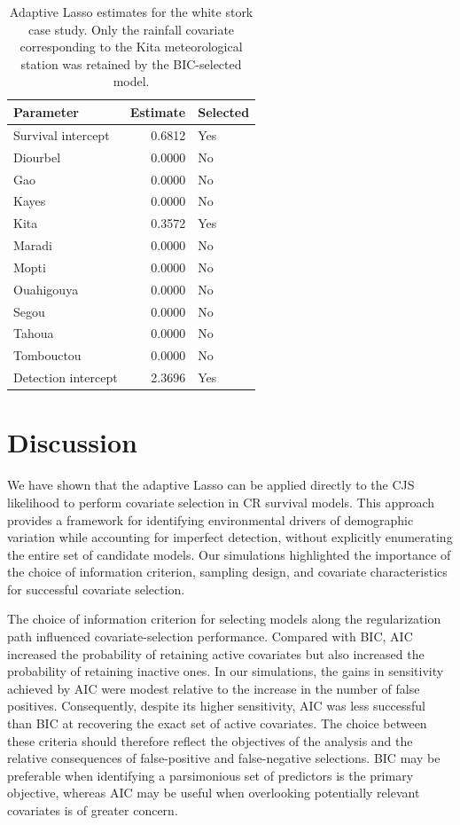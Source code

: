 \documentclass[
  11pt,
  a4paper,
]{article}
\begin{document}
\begin{table}

\caption{\label{tab:coef-table}Adaptive Lasso estimates for the white stork case study. Only the rainfall covariate corresponding to the Kita meteorological station was retained by the BIC-selected model.}
\centering
\begin{tabular}[t]{lrl}
\toprule
Parameter & Estimate & Selected\\
\midrule
Survival intercept & 0.6812 & Yes\\
Diourbel & 0.0000 & No\\
Gao & 0.0000 & No\\
Kayes & 0.0000 & No\\
Kita & 0.3572 & Yes\\
\addlinespace
Maradi & 0.0000 & No\\
Mopti & 0.0000 & No\\
Ouahigouya & 0.0000 & No\\
Segou & 0.0000 & No\\
Tahoua & 0.0000 & No\\
\addlinespace
Tombouctou & 0.0000 & No\\
Detection intercept & 2.3696 & Yes\\
\bottomrule
\end{tabular}
\end{table}

\section{Discussion}\label{discussion}

We have shown that the adaptive Lasso can be applied directly to the CJS likelihood to perform covariate selection in CR survival models. This approach provides a framework for identifying environmental drivers of demographic variation while accounting for imperfect detection, without explicitly enumerating the entire set of candidate models. Our simulations highlighted the importance of the choice of information criterion, sampling design, and covariate characteristics for successful covariate selection.

The choice of information criterion for selecting models along the regularization path influenced covariate-selection performance. Compared with BIC, AIC increased the probability of retaining active covariates but also increased the probability of retaining inactive ones. In our simulations, the gains in sensitivity achieved by AIC were modest relative to the increase in the number of false positives. Consequently, despite its higher sensitivity, AIC was less successful than BIC at recovering the exact set of active covariates. The choice between these criteria should therefore reflect the objectives of the analysis and the relative consequences of false-positive and false-negative selections. BIC may be preferable when identifying a parsimonious set of predictors is the primary objective, whereas AIC may be useful when overlooking potentially relevant covariates is of greater concern.
\end{document}
